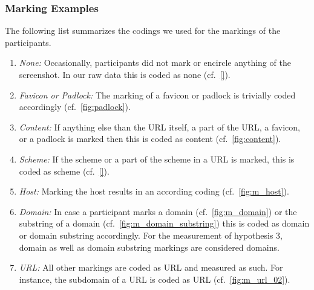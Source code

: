 \subsubsection{Marking Examples}
The following list summarizes the codings we used for the markings of the participants.

\begin{enumerate}
	\item\textit{None:} Occasionally, participants did not mark or encircle anything of the screenshot. In our raw data this is coded as none (cf.~\autoref{}).
	\item\textit{Favicon or Padlock:} The marking of a favicon or padlock is trivially coded accordingly (cf.~\autoref{fig:padlock}).
	\item\textit{Content:} If anything else than the URL itself, a part of the URL, a favicon, or a padlock is marked then this is coded as content (cf.~\autoref{fig:content}).
	\item\textit{Scheme:} If the scheme or a part of the scheme in a URL is marked, this is coded as scheme (cf.~\autoref{}).
	\item\textit{Host:} Marking the host results in an according coding (cf.~\autoref{fig:m_host}).
	\item\textit{Domain:} In case a participant marks a domain (cf.~\autoref{fig:m_domain}) or the substring of a domain (cf.~\autoref{fig:m_domain_substring}) this is coded as domain or domain substring accordingly.
For the measurement of hypothesis 3, domain as well as domain substring markings are considered domains.
	\item\textit{URL:} All other markings are coded as URL and measured as such. For instance, the subdomain of a URL is coded as URL (cf.~\autoref{fig:m_url_02}).
\end{enumerate}

